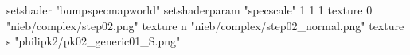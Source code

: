setshader "bumpspecmapworld"
setshaderparam "specscale" 1 1 1
   texture 0 "nieb/complex/step02.png"
   texture n "nieb/complex/step02_normal.png"
   texture s "philipk2/pk02_generic01_S.png"